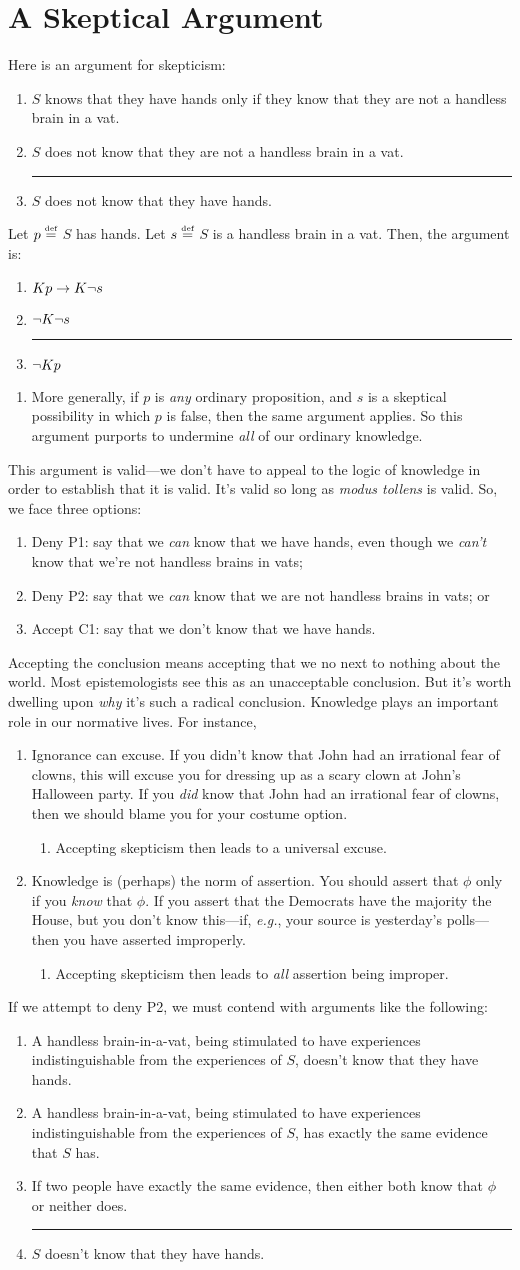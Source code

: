 \documentclass[landscape, two column, full page,reqno]{article}
\let\mathcal\relax
\newcommand{\mathcal}{\OMScal}%
\newcommand{\qe}{\begin{enumerate}}
\newcommand{\ze}{\end{enumerate}}
\newcommand{\p}{\item}
\newcommand{\e}{\emph}
\newcommand{\argu}[2]{\begin{center}\begin{minipage}{#1} \begin{enumerate}
	#2
\end{enumerate}
\end{minipage}  
\end{center}}
\newcommand{\thus}{

\vspace{5pt}

\hrule

\vspace{-3pt}

}
\newcommand{\K}{\mathcal{K}}
\newcommand{\df}{\stackrel{\text{\tiny def}}{=}}
\begin{document}
\section{A Skeptical Argument}
\p Here is an argument for skepticism:
	\argu{250pt}{
	\p[P1.] $S$ knows that they have hands only if they know that they are not a handless brain in a vat.
	\p[P2.] $S$ does not know that they are not a handless brain in a vat.
	\thus
	\p[C1.] $S$ does not know that they have hands.
	}
Let $p \df$ $S$ has hands.  Let $s \df$ $S$ is a handless brain in a vat.   Then, the argument is:
		\argu{90pt}{
		\p[P1.] $\K p \to \K \neg s$
		\p[P2.] $\neg \K \neg s$
		\thus
		\p[C1.] $\neg \K p$
		} 
	\qe
	\p More generally, if $p$ is \e{any} ordinary proposition, and $s$ is a skeptical possibility in which $p$ is false, then the same argument applies.  So this argument purports to undermine \e{all} of our ordinary knowledge.
	\ze 
\p This argument is valid---we don't have to appeal to the logic of knowledge in order to establish that it is valid.  It's valid so long as \e{modus tollens} is valid.  So, we face three options:
	\qe
	\p Deny P1: say that we \e{can} know that we have hands, even though we \e{can't} know that we're not handless brains in vats; 
	\p Deny P2: say that we \e{can} know that we are not handless brains in vats; or
	\p Accept C1: say that we don't know that we have hands.
	\ze 
\p Accepting the conclusion means accepting that we no next to nothing about the world.  Most epistemologists see this as an unacceptable conclusion.  But it's worth dwelling upon \e{why} it's such a radical conclusion.  Knowledge plays an important role in our normative lives.  For instance,
	\qe
	\p  Ignorance can excuse.  If you didn't know that John had an irrational fear of clowns, this will excuse you for dressing up as a scary clown at John's Halloween party.  If you \e{did} know that John had an irrational fear of clowns, then we should blame you for your costume option.
		\qe
		\p Accepting skepticism then leads to a universal excuse.
		\ze 
	\p Knowledge is (perhaps) the norm of assertion.  You should assert that $\phi$ only if you \e{know} that $\phi$.  If you assert that the Democrats have the majority the House, but you don't know this---if, \e{e.g.}, your source is yesterday's polls---then you have asserted improperly.
		\qe
		\p Accepting skepticism then leads to \e{all} assertion being improper.
		\ze 
	\ze 
\p If we attempt to deny P2, we must contend with arguments like the following: 
	\argu{290pt}{
	\p[P3.] A handless brain-in-a-vat, being stimulated to have experiences indistinguishable from the experiences of $S$, doesn't know that they have hands.
	\p[P4.] A handless brain-in-a-vat, being stimulated to have experiences indistinguishable from the experiences of $S$, has exactly the same evidence that $S$ has.
	\p[P5.] If two people have exactly the same evidence, then either both  know that $\phi$ or neither does.
	\thus
	\p[C2.] $S$  doesn't know that they have hands.
	}
\end{document}
